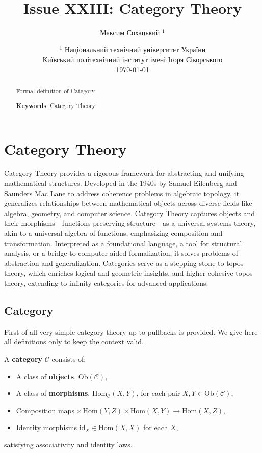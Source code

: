 \documentclass{article}
\begin{document}
\title{Issue XXIII: Category Theory}
\author{Максим Сохацький $^1$}
\date{ $^1$ Національний технічний університет України \\
       \small Київський політехнічний інститут імені Ігоря Сікорського \\
       \today }
\maketitle

\begin{abstract}

Formal definition of Category.

{\bf Keywords}: Category Theory \\
\end{abstract}

\ifincludeTOC
  \tableofcontents
\fi

\section{Category Theory}

Category Theory provides a rigorous framework for abstracting and unifying mathematical structures.
Developed in the 1940s by Samuel Eilenberg and Saunders Mac Lane to address coherence problems in
algebraic topology, it generalizes relationships between mathematical objects across diverse fields
like algebra, geometry, and computer science. Category Theory captures objects and their
morphisms—functions preserving structure—as a universal systems theory,
akin to a universal algebra of functions, emphasizing composition and transformation.
Interpreted as a foundational language, a tool for structural analysis,
or a bridge to computer-aided formalization, it solves problems of abstraction and generalization.
Categories serve as a stepping stone to topos theory, which enriches logical and geometric insights,
and higher cohesive topos theory, extending to infinity-categories for advanced applications.


\newpage
\subsection{Category}

First of all very simple category theory up to pullbacks is provided. We give here
all definitions only to keep the context valid.

A \textbf{category} $\mathcal{C}$ consists of:
\begin{itemize}
  \item A class of \textbf{objects}, $\mathrm{Ob}(\mathcal{C})$,
  \item A class of \textbf{morphisms}, $\mathrm{Hom}_{\mathcal{C}}(X,Y)$, for each pair $X,Y \in \mathrm{Ob}(\mathcal{C})$,
  \item Composition maps $\circ: \mathrm{Hom}(Y,Z) \times \mathrm{Hom}(X,Y) \to \mathrm{Hom}(X,Z)$,
  \item Identity morphisms $\mathrm{id}_X \in \mathrm{Hom}(X,X)$ for each $X$,
\end{itemize}
satisfying associativity and identity laws.
\end{document}
